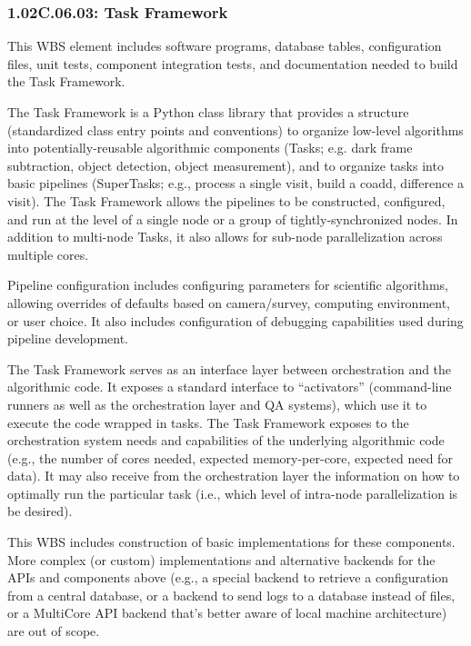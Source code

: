 \subsubsection{1.02C.06.03: Task Framework}

This WBS element includes software programs, database tables, configuration files, unit tests, component integration tests, and documentation needed to build the Task Framework.

The Task Framework is a Python class library that provides a structure (standardized class entry points and conventions) to organize low-level algorithms into potentially-reusable algorithmic components (Tasks; e.g. dark frame subtraction, object detection, object measurement), and to organize tasks into basic pipelines (SuperTasks; e.g., process a single visit, build a coadd, difference a visit). The Task Framework allows the pipelines to be constructed, configured, and run at the level of a single node or a group of tightly-synchronized nodes. In addition to multi-node Tasks, it also allows for sub-node parallelization across multiple cores.

Pipeline configuration includes configuring parameters for scientific algorithms, allowing overrides of defaults based on camera/survey, computing environment, or user choice.  It also includes configuration of debugging capabilities used during pipeline development.

The Task Framework serves as an interface layer between orchestration and the algorithmic code. It exposes a standard interface to ``activators'' (command-line runners as well as the orchestration layer and QA systems), which use it to execute the code wrapped in tasks. The Task Framework exposes to the orchestration system needs and capabilities of the underlying algorithmic code (e.g., the number of cores needed, expected memory-per-core, expected need for data). It may also receive from the orchestration layer the information on how to optimally run the particular task (i.e., which level of intra-node parallelization is be desired).

This WBS includes construction of basic implementations for these components.  More complex (or custom) implementations and alternative backends for the APIs and components above (e.g., a special backend to retrieve a configuration from a central database, or a backend to send logs to a database instead of files, or a MultiCore API backend that's better aware of local machine architecture) are out of scope.
